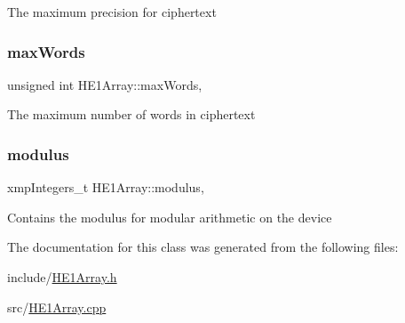 The maximum precision for {\ttfamily ciphertext} \mbox{\label{classHE1Array_acfcbb207535ce6e489b986e36080c784}} 
\subsubsection{\texorpdfstring{max\+Words}{maxWords}}
{\footnotesize\ttfamily unsigned int H\+E1\+Array\+::max\+Words\hspace{0.3cm}{\ttfamily [static]}, {\ttfamily [private]}}

The maximum number of words in {\ttfamily ciphertext} \mbox{\label{classHE1Array_a164afa9080888fad5d805a98021d9c57}} 
\subsubsection{\texorpdfstring{modulus}{modulus}}
{\footnotesize\ttfamily xmp\+Integers\+\_\+t H\+E1\+Array\+::modulus\hspace{0.3cm}{\ttfamily [static]}, {\ttfamily [private]}}

Contains the modulus for modular arithmetic on the device 

The documentation for this class was generated from the following files\+:\begin{DoxyCompactItemize}
\item 
include/\hyperlink{HE1Array_8h}{H\+E1\+Array.\+h}\item 
src/\hyperlink{HE1Array_8cpp}{H\+E1\+Array.\+cpp}\end{DoxyCompactItemize}
